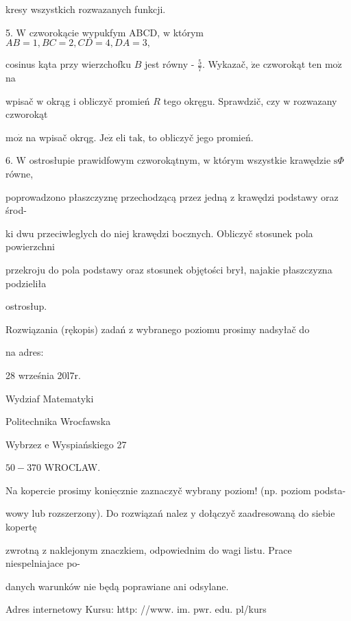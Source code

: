 \documentclass[a4paper,12pt]{article}
\begin{document}
kresy wszystkich rozwazanych funkcji.

5. $\mathrm{W}$ czworokącie wypukfym ABCD, $\mathrm{w}$ którym $AB= 1, BC = 2, CD = 4, DA = 3,$

cosinus kąta przy wierzchofku $B$ jest równy - $\displaystyle \frac{5}{7}$. Wykazač, $\dot{\mathrm{z}}\mathrm{e}$ czworokąt ten $\mathrm{m}\mathrm{o}\dot{\mathrm{z}}$ na

wpisač $\mathrm{w}$ okrąg $\mathrm{i}$ obliczyč promień $R$ tego okręgu. Sprawdzič, czy $\mathrm{w}$ rozwazany czworokąt

$\mathrm{m}\mathrm{o}\dot{\mathrm{z}}$ na wpisač okrqg. $\mathrm{J}\mathrm{e}\dot{\mathrm{z}}$ eli $\mathrm{t}\mathrm{a}\mathrm{k}$, to obliczyč jego promień.

6. $\mathrm{W}$ ostrosłupie prawidfowym czworokątnym, $\mathrm{w}$ którym wszystkie krawędzie $\mathrm{s}\Phi$ równe,

poprowadzono płaszczyznę przechodzącą przez jedną $\mathrm{z}$ krawędzi podstawy oraz środ-

ki dwu przeciwleglych do niej krawędzi bocznych. Obliczyč stosunek pola powierzchni

przekroju do pola podstawy oraz stosunek objętości brył, najakie płaszczyzna podzieliła

ostrosłup.

Rozwiązania (rękopis) zadań z wybranego poziomu prosimy nadsyłač do

na adres:

28 września 20l7r.

Wydziaf Matematyki

Politechnika Wrocfawska

Wybrzez $\mathrm{e}$ Wyspiańskiego 27

$50-370$ WROCLAW.

Na kopercie prosimy $\underline{\mathrm{k}\mathrm{o}\mathrm{n}\mathrm{i}\mathrm{e}\mathrm{c}\mathrm{z}\mathrm{n}\mathrm{i}\mathrm{e}}$ zaznaczyč wybrany poziom! (np. poziom podsta-

wowy lub rozszerzony). Do rozwiązań nalez $\mathrm{y}$ dołączyč zaadresowaną do siebie kopertę

zwrotną $\mathrm{z}$ naklejonym znaczkiem, odpowiednim do wagi listu. Prace niespelniajace po-

danych warunków nie będą poprawiane ani odsylane.

Adres internetowy Kursu: http: //www. im. pwr. edu. pl/kurs
\end{document}
